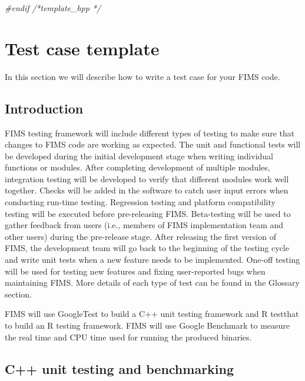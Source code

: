 \documentclass[
]{book}
\newenvironment{Shaded}{\begin{snugshade}}{\end{snugshade}}
\newcommand{\CommentTok}[1]{\textcolor[rgb]{0.56,0.35,0.01}{\textit{#1}}}
\newcommand{\PreprocessorTok}[1]{\textcolor[rgb]{0.56,0.35,0.01}{\textit{#1}}}
\begin{document}
\begin{Shaded}
\begin{Highlighting}[]
\PreprocessorTok{\#endif }\CommentTok{/*template\_hpp */}
\end{Highlighting}
\end{Shaded}

\hypertarget{test-case-template}{%
\chapter{Test case template}\label{test-case-template}}

In this section we will describe how to write a test case for your FIMS code.

\hypertarget{introduction}{%
\section{Introduction}\label{introduction}}

FIMS testing framework will include different types of testing to make sure that changes to FIMS code are working as expected. The unit and functional tests will be developed during the initial development stage when writing individual functions or modules. After completing development of multiple modules, integration testing will be developed to verify that different modules work well together. Checks will be added in the software to catch user input errors when conducting run-time testing. Regression testing and platform compatibility testing will be executed before pre-releasing FIMS. Beta-testing will be used to gather feedback from users (i.e., members of FIMS implementation team and other users) during the pre-release stage. After releasing the first version of FIMS, the development team will go back to the beginning of the testing cycle and write unit tests when a new feature needs to be implemented. One-off testing will be used for testing new features and fixing user-reported bugs when maintaining FIMS. More details of each type of test can be found in the Glossary section.

FIMS will use GoogleTest to build a C++ unit testing framework and R testthat to build an R testing framework. FIMS will use Google Benchmark to measure the real time and CPU time used for running the produced binaries.

\hypertarget{c-unit-testing-and-benchmarking}{%
\section{C++ unit testing and benchmarking}\label{c-unit-testing-and-benchmarking}}
\end{document}
